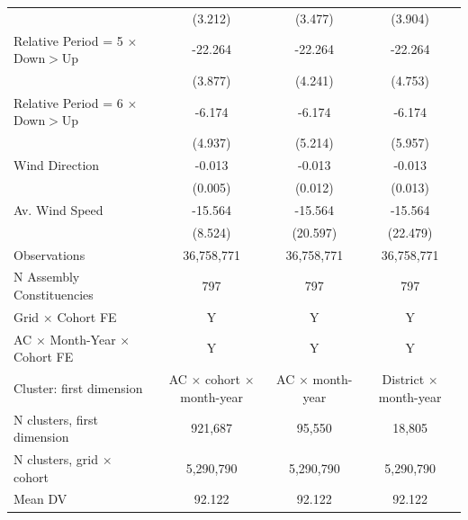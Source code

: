 {\begin{tabular}{l*{3}{c}}
            &     (3.212)         &     (3.477)         &     (3.904)         \\
Relative Period = 5 $\times$ Down$>$Up&     -22.264\sym{***}&     -22.264\sym{***}&     -22.264\sym{***}\\
            &     (3.877)         &     (4.241)         &     (4.753)         \\
Relative Period = 6 $\times$ Down$>$Up&      -6.174         &      -6.174         &      -6.174         \\
            &     (4.937)         &     (5.214)         &     (5.957)         \\
Wind Direction&      -0.013\sym{**} &      -0.013         &      -0.013         \\
            &     (0.005)         &     (0.012)         &     (0.013)         \\
Av. Wind Speed&     -15.564\sym{*}  &     -15.564         &     -15.564         \\
            &     (8.524)         &    (20.597)         &    (22.479)         \\
\hline
Observations&  36,758,771         &  36,758,771         &  36,758,771         \\
N Assembly Constituencies&         797         &         797         &         797         \\
Grid $\times$ Cohort FE&           Y         &           Y         &           Y         \\
AC $\times$ Month-Year $\times$ Cohort FE&           Y         &           Y         &           Y         \\
Cluster: first dimension&AC $\times$ cohort $\times$ month-year         &AC $\times$ month-year         &District $\times$ month-year         \\
N clusters, first dimension&     921,687         &      95,550         &      18,805         \\
N clusters, grid $\times$ cohort&   5,290,790         &   5,290,790         &   5,290,790         \\
Mean DV     &      92.122         &      92.122         &      92.122         \\
\hline
\end{tabular}
}
